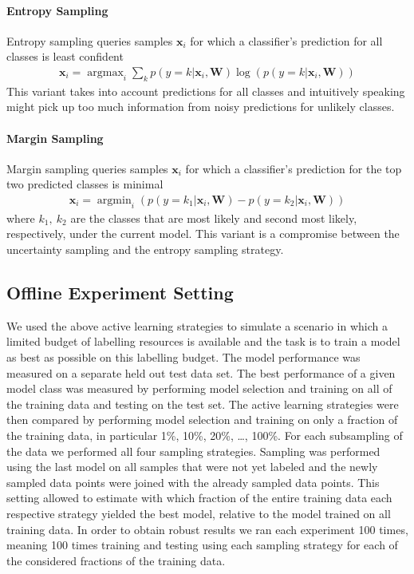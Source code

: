 \documentclass[runningheads,a4paper]{article}
\renewcommand{\vec}[1]{\mathbf{#1}}
\DeclareMathOperator*{\argmax}{argmax}
\DeclareMathOperator*{\argmin}{argmin}
\begin{document}
\paragraph{Entropy Sampling}
Entropy sampling queries samples $\vec{x}_i$ for which a classifier's prediction for all classes is least confident
\begin{align}\label{eq:entropy_sampling}
\vec{x}_i = \argmax_{i} \sum_k p(y=k|\vec{x}_i,\vec{W}) \log(p(y=k|\vec{x}_i,\vec{W}))
\end{align}
This variant takes into account predictions for all classes and intuitively speaking might pick up too much information from noisy predictions for unlikely classes. 

\paragraph{Margin Sampling}
Margin sampling queries samples $\vec{x}_i$ for which a classifier's prediction for the top two predicted classes is minimal
\begin{align}\label{eq:entropy_sampling}
\vec{x}_i = \argmin_{i} \left(p(y=k_1|\vec{x}_i,\vec{W}) - p(y=k_2|\vec{x}_i,\vec{W}) \right)
\end{align}
where $k_1,~k_2$ are the classes that are most likely and second most likely, respectively, under the current model. 
This variant is a compromise between the uncertainty sampling and the entropy sampling strategy.

\subsection{Offline Experiment Setting}
We used the above active learning strategies to simulate a scenario in which a limited budget of labelling resources is available and the task is to train a model as best as possible on this labelling budget. The model performance was measured on a separate held out test data set. The best performance of a given model class was measured by performing model selection and training on all of the training data and testing on the test set. The active learning strategies were then compared by performing model selection and training on only a fraction of the training data, in particular 1\%, 10\%, 20\%, \dots, 100\%. For each subsampling of the data we performed all four sampling strategies. Sampling was performed using the last model on all samples that were not yet labeled and the newly sampled data points were joined with the already sampled data points. This setting allowed to estimate with which fraction of the entire training data each respective strategy yielded the best model, relative to the model trained on all training data. In order to obtain robust results we ran each experiment 100 times, meaning 100 times training and testing using each sampling strategy for each of the considered fractions of the training data. 
\end{document}
